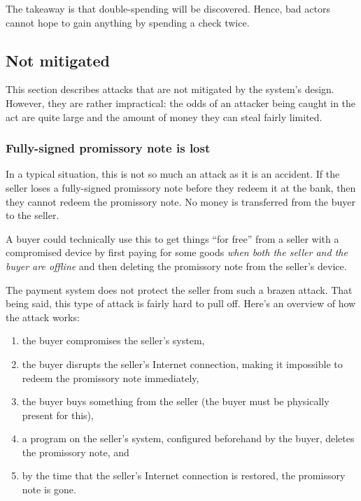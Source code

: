 \documentclass[12pt,a4paper]{article}
\begin{document}
\begin{multicols}{2}
	The takeaway is that double-spending will be discovered. Hence, bad actors cannot hope to gain anything by spending a check twice.

	\subsection{Not mitigated}
	
	This section describes attacks that are not mitigated by the system's design. However, they are rather impractical: the odds of an attacker being caught in the act are quite large and the amount of money they can steal fairly limited.

	\subsubsection{Fully-signed promissory note is lost}
	\label{sec:signed-promissory-note-is-lost}

	In a typical situation, this is not so much an attack as it is an accident. If the seller loses a fully-signed promissory note before they redeem it at the bank, then they cannot redeem the promissory note. No money is transferred from the buyer to the seller.

	A buyer could technically use this to get things ``for free'' from a seller with a compromised device by first paying for some goods \emph{when both the seller and the buyer are offline} and then deleting the promissory note from the seller's device.

	The payment system does not protect the seller from such a brazen attack. That being said, this type of attack is fairly hard to pull off. Here's an overview of how the attack works:

	\begin{enumerate}
		\item the buyer compromises the seller's system,
		\item the buyer disrupts the seller's Internet connection, making it impossible to redeem the promissory note immediately,
		\item the buyer buys something from the seller (the buyer must be physically present for this),
		\item a program on the seller's system, configured beforehand by the buyer, deletes the promissory note, and
		\item by the time that the seller's Internet connection is restored, the promissory note is gone.
	\end{enumerate}


\end{multicols}
\end{document}
